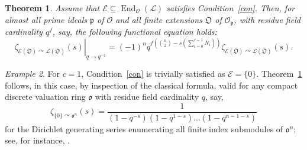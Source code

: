 \documentclass[11pt]{amsart}
\numberwithin{equation}{section}
\numberwithin{figure}{section}
\theoremstyle{plain}
\newtheorem{theorem}{Theorem}[section]
\theoremstyle{definition}
\theoremstyle{remark}
\newtheorem{example}[theorem]{Example}
\begin{document}
\begin{theorem}\label{thm:main}
  Assume that ${\mathcal{E}}\subseteq \operatorname{End}_{\ensuremath{\mathcal{O}}}({\ensuremath{\mathcal{L}}})$ satisfies
Condition~\ref{con}.  Then, for almost all prime ideals ${\mathfrak{p}}$ of
${\mathcal{O}}$ and all finite extensions ${\mathfrak O}$ of ${\ensuremath{\mathcal{O}}}_{\mathfrak{p}}$, with residue
field cardinality $q^f$, say, the following functional equation holds:
\begin{equation}\label{equ:funeq.submodule}
  \left. \zeta_{{\mathcal{E}}({\mathfrak O}) {\curvearrowright} {\ensuremath{\mathcal{L}}}({\mathfrak O})}(s)\right|_{q {\rightarrow}
    q^{-1}} = (-1)^n
  q^{f\left(\binom{n}{2}-s\left(\sum_{i=0}^{c-1}N_i\right)\right)}\zeta_{{\mathcal{E}}({\mathfrak O})
    {\curvearrowright} {\ensuremath{\mathcal{L}}}({\mathfrak O})}(s).
\end{equation}
\end{theorem}

\begin{example}\label{exa:c=1}
For $c=1$, Condition~\ref{con} is trivially satisfied as ${\mathcal{E}} =
\{0\}$. Theorem~\ref{thm:main} follows, in this case, by inspection of
the classical formula, valid for any compact discrete valuation ring
${\mathfrak o}$ with residue field cardinality $q$, say,
\begin{equation}\label{equ:c=1}
  \zeta_{\{0\}{\curvearrowright} {\mathfrak o}^n}(s) = \frac{1}{(1-q^{-s})(1-q^{1-s})\dots(1-q^{n-1-s})}
\end{equation}
for the Dirichlet generating series enumerating all finite index
submodules of ${\mathfrak o}^n$; see, for instance,
\cite[Proposition~1.1]{GSS/88}.
\end{example}
\end{document}
